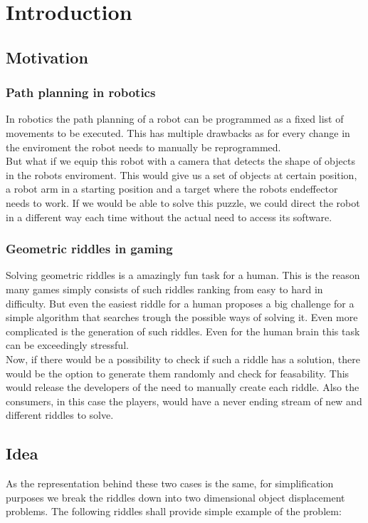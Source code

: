\chapter{Introduction}
\label{cha:Introduction}

\section{Motivation}
\subsection{Path planning in robotics}
In robotics the path planning of a robot can be programmed as a fixed list of movements to be executed. This has multiple drawbacks as for every change in the enviroment the robot needs to manually be reprogrammed.\\
But what if we equip this robot with a camera that detects the shape of objects in the robots enviroment. This would give us a set of objects at certain position, a robot arm in a starting position and a target where the robots endeffector needs to work. If we would be able to solve this puzzle, we could direct the robot in a different way each time without the actual need to access its software.


\subsection{Geometric riddles in gaming}
Solving geometric riddles is a amazingly fun task for a human. This is the reason many games simply consists of such riddles ranking from easy to hard in difficulty. But even the easiest riddle for a human proposes a big challenge for a simple algorithm that searches trough the possible ways of solving it. Even more complicated is the generation of such riddles. Even for the human brain this task can be exceedingly stressful.\\
 Now, if there would be a possibility to check if such a riddle has a solution, there would be the option to generate them randomly and check for feasability. This would release the developers of the need to manually create each riddle. Also the consumers, in this case the players, would have a never ending stream of new and different riddles to solve.



\section{Idea}
As the representation behind these two cases is the same, for simplification purposes we break the riddles down into two dimensional object displacement problems. The following riddles shall provide simple example of the problem:\\

